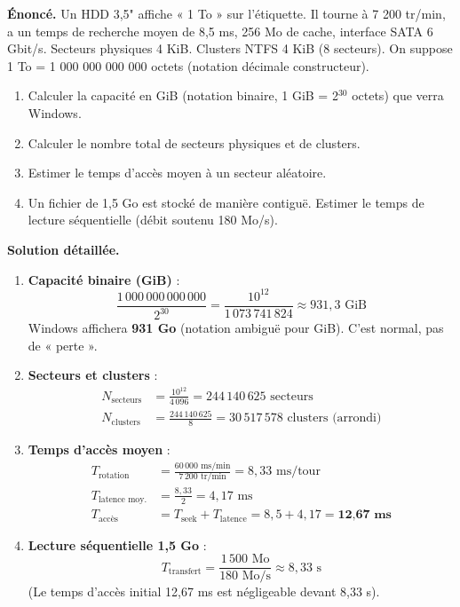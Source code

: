 \documentclass[11pt]{article}
\begin{document}
\begin{exoresolu}
\textbf{Énoncé.} Un HDD 3,5" affiche « 1 To » sur l'étiquette. Il tourne à 7 200 tr/min, a un temps de recherche moyen de 8,5 ms, 256 Mo de cache, interface SATA 6 Gbit/s. Secteurs physiques 4 KiB. Clusters NTFS 4 KiB (8 secteurs). On suppose 1 To = 1 000 000 000 000 octets (notation décimale constructeur).
\begin{enumerate}
    \item Calculer la capacité en GiB (notation binaire, 1 GiB = 2$^{30}$ octets) que verra Windows.
    \item Calculer le nombre total de secteurs physiques et de clusters.
    \item Estimer le temps d'accès moyen à un secteur aléatoire.
    \item Un fichier de 1,5 Go est stocké de manière contiguë. Estimer le temps de lecture séquentielle (débit soutenu 180 Mo/s).
\end{enumerate}

\tcblower
\textbf{Solution détaillée.}
\begin{enumerate}
    \item \textbf{Capacité binaire (GiB)} :
    \[
    \frac{1\,000\,000\,000\,000}{2^{30}} = \frac{10^{12}}{1\,073\,741\,824} \approx 931,3 \text{ GiB}
    \]
    Windows affichera \textbf{931 Go} (notation ambiguë pour GiB). C'est normal, pas de « perte ».

    \item \textbf{Secteurs et clusters} :
    \begin{align*}
    N_{\text{secteurs}} &= \frac{10^{12}}{4\,096} = 244\,140\,625 \text{ secteurs} \\
    N_{\text{clusters}} &= \frac{244\,140\,625}{8} = 30\,517\,578 \text{ clusters (arrondi)}
    \end{align*}

    \item \textbf{Temps d'accès moyen} :
    \begin{align*}
    T_{\text{rotation}} &= \frac{60\,000 \text{ ms/min}}{7\,200 \text{ tr/min}} = 8,33 \text{ ms/tour} \\
    T_{\text{latence moy.}} &= \frac{8,33}{2} = 4,17 \text{ ms} \\
    T_{\text{accès}} &= T_{\text{seek}} + T_{\text{latence}} = 8,5 + 4,17 = \textbf{12,67 ms}
    \end{align*}

    \item \textbf{Lecture séquentielle 1,5 Go} :
    \[
    T_{\text{transfert}} = \frac{1\,500 \text{ Mo}}{180 \text{ Mo/s}} \approx 8,33 \text{ s}
    \]
    (Le temps d'accès initial 12,67 ms est négligeable devant 8,33 s).
\end{enumerate}
\end{exoresolu}
\end{document}
